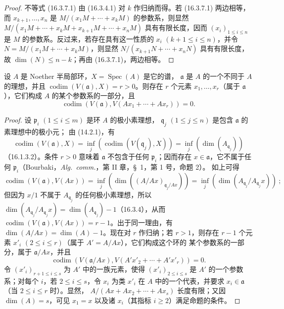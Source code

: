 \begin{proof}
不等式 (16.3.7.1) 由 (16.3.4.1) 对 $k$ 作归纳而得。若 (16.3.7.1) 两边相等，
而 $x_{k+1},\ldots,x_n$ 是 $M/(x_1M+\cdots+x_kM)$ 的参数系，则显然
$M/(x_1M+\cdots+x_kM+x_{k+1}M+\cdots+x_nM)$ 具有有限长度，因而
$(x_i)_{1\leq i\leq n}$ 是 $M$ 的参数系。反过来，若存在具有这一性质的
$x_i$ $(k+1\leq i\leq n)$，并令 $N=M/(x_1M+\cdots+x_kM)$，则显然
$N/(x_{k+1}N+\cdots+x_nN)$ 具有有限长度，故 $\dim(N)\leq n-k$；再由
(16.3.7.1)，两边相等。
\end{proof}


\begin{proposition}[16.3.8]
\label{0.16.3.8-fr}
设 $A$ 是 Noether 半局部环，$X=\operatorname{Spec}(A)$ 是它的谱，
$\mathfrak{a}$ 是 $A$ 的一个不同于 $A$ 的理想，并且
$\operatorname{codim}(V(\mathfrak{a}),X)=r>0$。则存在 $r$ 个元素
$x_1,\ldots,x_r$（属于 $\mathfrak{a}$），它们构成 $A$ 的某个参数系的一部分，且
\[
  \operatorname{codim}(V(\mathfrak{a}),
  V(Ax_1+\cdots+Ax_r))=0.
\]
\end{proposition}

\begin{proof}
设 $\mathfrak{p}_i$ $(1\leq i\leq m)$ 是环 $A$ 的极小素理想，
$\mathfrak{q}_j$ $(1\leq j\leq n)$ 是包含 $\mathfrak{a}$ 的素理想中的极小元；
由 (14.2.1)，有
\[
  \operatorname{codim}(V(\mathfrak{a}),X)
  =\inf_j(\operatorname{codim}(V(\mathfrak{q}_j),X))
  =\inf_j(\dim(A_{\mathfrak{q}_j}))
\]
（16.1.3.2）。条件 $r>0$ 意味着 $\mathfrak{a}$ 不包含于任何
$\mathfrak{p}_i$；因而存在 $x\in\mathfrak{a}$，它不属于任何
$\mathfrak{p}_i$（Bourbaki，\emph{Alg.~comm.}，第 II 章，\S~1，第 1 号，命题 2）。
如上可得
\[
  \operatorname{codim}(V(\mathfrak{a}),V(Ax))
  =\inf_j(\dim((A/Ax)_{\mathfrak{q}_j/Ax}))
  =\inf_j(\dim(A_{\mathfrak{q}_j}/A_{\mathfrak{q}_j}x))~;
\]
但因为 $x/1$ 不属于 $A_{\mathfrak{q}_j}$ 的任何极小素理想，所以
$\dim(A_{\mathfrak{q}_j}/A_{\mathfrak{q}_j}x)
=\dim(A_{\mathfrak{q}_j})-1$（16.3.4），从而
$\operatorname{codim}(V(\mathfrak{a}),V(Ax))=r-1$。出于同一理由，有
$\dim(A/Ax)=\dim(A)-1$。现在对 $r$ 作归纳；若 $r>1$，则存在
$r-1$ 个元素 $x'_i$ $(2\leq i\leq r)$（属于 $A'=A/Ax$），它们构成这个环的
某个参数系的一部分，属于 $\mathfrak{a}/Ax$，并且
\[
  \operatorname{codim}(V(\mathfrak{a}/Ax),
  V(A'x'_2+\cdots+A'x'_r))=0.
\]
令 $(x'_i)_{r+1\leq i\leq s}$ 为 $A'$ 中的一族元素，使得
$(x'_i)_{2\leq i\leq s}$ 是 $A'$ 的一个参数系；对每个 $i$，若
$2\leq i\leq s$，令 $x_i$ 为类 $x'_i$ 在 $A$ 中的一个代表，并要求
$x_i\in\mathfrak{a}$（当 $2\leq i\leq r$ 时）。显然，
$A/(Ax+Ax_2+\cdots+Ax_s)$ 长度有限；又因 $\dim(A)=s$，可见
$x_1=x$ 以及诸 $x_i$（其指标 $i\geq2$）满足命题的条件。
\end{proof}

